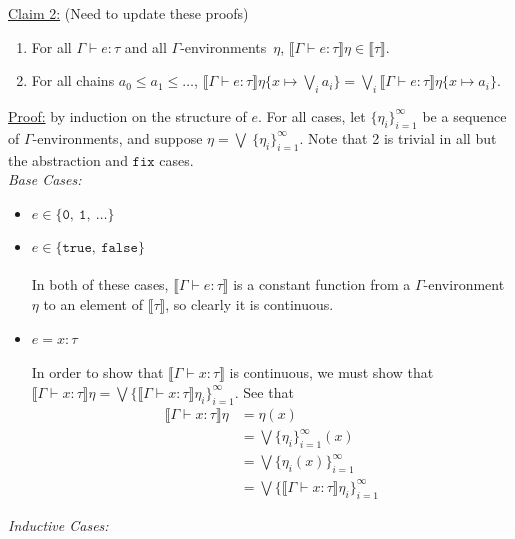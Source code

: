 \documentclass{westhesis}
\newcommand{\tmden}[2]{\llbracket{#1}\rrbracket{#2}}
\newcommand{\tyden}[1]{\llbracket{#1}\rrbracket}
\newcommand{\typing}[3]{{#1}\vdash{#2}:{#3}}
\newcommand{\extend}[3]{#1\{{#2}\mapsto{#3}\}}
\begin{document}
%
 \underline{Claim 2:} (Need to update these proofs)
\begin{enumerate}
\item For all $\Gamma\vdash e : \tau$ and all $\Gamma$-environments~$\eta$,
$\tmden{\typing\Gamma e\tau}\eta\in\tyden{\tau}$.
\item For all chains $a_0\leq a_1\leq\dots$,
$\tmden{\typing\Gamma e\tau}{\extend\eta x {\bigvee_i a_i}} =
\bigvee_i\tmden{\typing\Gamma e\tau}{\extend\eta x {a_i}}$.
\end{enumerate}
 \underline{Proof:} by induction on the structure of $e$. For all cases, let $\{ \eta_i \}^{\infty}_{i=1}$ be a sequence of $
 \Gamma$-environments, and suppose $ \eta = \bigvee \ \{ \eta_i \}^{\infty}_{i=1}$. Note that 2 is trivial in all but the abstraction
 and $\texttt{fix}$ cases.\\
 \emph{Base Cases: } 
 \begin{itemize}
 \item $e \in \{ \texttt{0}, \ \texttt{1}, \ \ldots \}$
 \item $e \in \{ \texttt{true}, \ \texttt{false} \}$\\ \\
  In both of these cases, $\llbracket \Gamma \vdash e : \tau \rrbracket$ is a constant function from a $\Gamma$-environment
 $\eta$ to an element of $\llbracket \tau \rrbracket$, so clearly it is continuous. 
 \item $e = x : \tau$ \\ \\
 In order to show that $\llbracket \Gamma \vdash x : \tau \rrbracket$ is continuous, we 
 must show that $\llbracket \Gamma \vdash x : \tau \rrbracket\eta = \bigvee \{ \llbracket \Gamma \vdash x : \tau \rrbracket
  \eta_i \}^{\infty}_{i=1}$. See that
  \begin{align*}
  \llbracket \Gamma \vdash x : \tau \rrbracket\eta &= \eta(x) \\
  &= \bigvee\{\eta_i\}^{\infty}_{i=1}(x) \\
  &= \bigvee\{\eta_i(x)\}^{\infty}_{i=1} \\
  &= \bigvee\{\llbracket \Gamma \vdash x : \tau \rrbracket\eta_i \}^{\infty}_{i=1}
  \end{align*}
 \end{itemize}
 \emph{Inductive Cases: }
\end{document}
